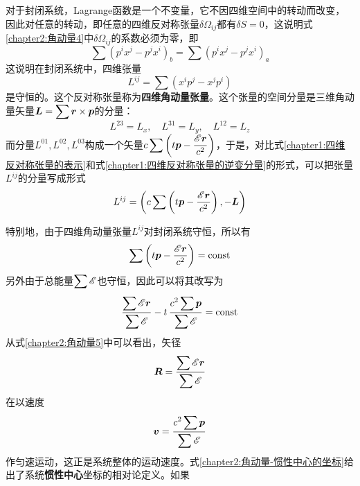 对于封闭系统，Lagrange函数是一个不变量，它不因四维空间中的转动而改变，因此对任意的转动，即任意的四维反对称张量$\delta\varOmega_{ij}$都有$\delta S=0$，这说明式\eqref{chapter2:角动量4}中$\delta\varOmega_{ij}$的系数必须为零，即
\begin{equation}
	\sum (p^ix^j-p^jx^i)_b = \sum (p^ix^j-p^jx^i)_a
\end{equation}
这说明在封闭系统中，四维张量
\begin{equation}
	L^{ij} = \sum (x^ip^j-x^jp^i)
	\label{chapter2:四维角动量张量的定义}
\end{equation}
是守恒的。这个反对称张量称为{\bf 四维角动量张量}。这个张量的空间分量是三维角动量矢量$\displaystyle \boldsymbol{L} = \sum\boldsymbol{r}\times \boldsymbol{p}$的分量：
\begin{equation*}
	L^{23} = L_x,\quad L^{31} = L_y,\quad L^{12} = L_z
\end{equation*}
而分量$L^{01}, L^{02}, L^{03}$构成一个矢量$\displaystyle c\sum \left(t\boldsymbol{p}-\dfrac{\mathscr{E}\boldsymbol{r}}{c^2}\right)$，于是，对比式\eqref{chapter1:四维反对称张量的表示}和式\eqref{chapter1:四维反对称张量的逆变分量}的形式，可以把张量$L^{ij}$的分量写成形式
\begin{equation}
	L^{ij} = \left(c\sum \left(t\boldsymbol{p}-\dfrac{\mathscr{E}\boldsymbol{r}}{c^2}\right), -\boldsymbol{L}\right)
	\label{chapter2:四维角动量张量的逆变分量表示}
\end{equation}

特别地，由于四维角动量张量$L^{ij}$对封闭系统守恒，所以有
\begin{equation*}
	\sum \left(t\boldsymbol{p}-\frac{\mathscr{E}\boldsymbol{r}}{c^2}\right) = \text{const}
\end{equation*}
另外由于总能量$\displaystyle\sum \mathscr{E}$也守恒，因此可以将其改写为
\begin{equation}
	\frac{\displaystyle \sum\mathscr{E}\boldsymbol{r}}{\displaystyle \sum \mathscr{E}} - t\,\frac{\displaystyle c^2\sum\boldsymbol{p}}{\displaystyle \sum\mathscr{E}} = \text{const}
	\label{chapter2:角动量5}
\end{equation}
从式\eqref{chapter2:角动量5}中可以看出，矢径
\begin{equation}
	\boldsymbol{R} = \frac{\displaystyle\sum \mathscr{E}\boldsymbol{r}}{\displaystyle\sum\mathscr{E}}
	\label{chapter2:角动量-惯性中心的坐标}
\end{equation}
在以速度
\begin{equation}
	\boldsymbol{v} = \frac{\displaystyle c^2\sum\boldsymbol{p}}{\displaystyle\sum\mathscr{E}}
	\label{chapter2:角动量-惯性中心的速度}
\end{equation}
作匀速运动，这正是系统整体的运动速度。式\eqref{chapter2:角动量-惯性中心的坐标}给出了系统{\bf 惯性中心}坐标的相对论定义。如果